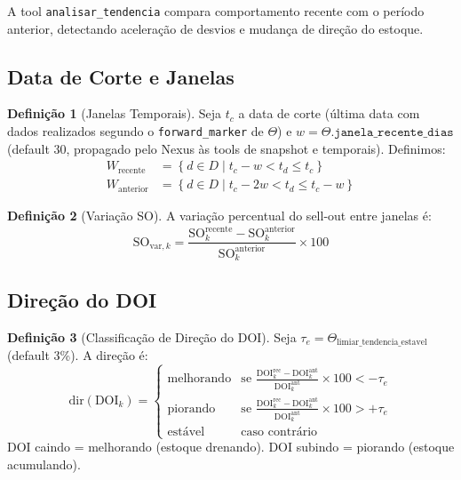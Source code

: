 \documentclass[a4paper, 12pt]{report}
\theoremstyle{definition}
\newtheorem{definicao}{Defini\c{c}\~ao}[chapter]
\theoremstyle{remark}
\newcommand{\set}[1]{\left\{#1\right\}}
\begin{document}
A tool \texttt{analisar\_tendencia} compara comportamento recente
com o per\'iodo anterior, detectando acelera\c{c}\~ao de desvios e
mudan\c{c}a de dire\c{c}\~ao do estoque.

\subsection{Data de Corte e Janelas}

\begin{definicao}[Janelas Temporais]
  Seja $t_c$ a data de corte (\'ultima data com dados realizados segundo
  o \texttt{forward\_marker} de $\Theta$) e
  $w = \Theta.\texttt{janela\_recente\_dias}$ (default $30$, propagado
  pelo Nexus \`as tools de snapshot e temporais). Definimos:
  \begin{align}
    W_{\text{recente}} &= \set{d \in D \mid t_c - w < t_d \leq t_c} \\
    W_{\text{anterior}} &= \set{d \in D \mid t_c - 2w < t_d \leq t_c - w}
  \end{align}
\end{definicao}

\begin{definicao}[Varia\c{c}\~ao SO]
  A varia\c{c}\~ao percentual do sell-out entre janelas \'e:
  \[
    \text{SO}_{\text{var},k} =
    \frac{\text{SO}^{\text{recente}}_k - \text{SO}^{\text{anterior}}_k}
         {\text{SO}^{\text{anterior}}_k} \times 100
  \]
\end{definicao}

\subsection{Dire\c{c}\~ao do DOI}

\begin{definicao}[Classifica\c{c}\~ao de Dire\c{c}\~ao do DOI]
  Seja $\tau_e = \Theta_{\text{limiar\_tendencia\_estavel}}$ (default 3\%).
  A dire\c{c}\~ao \'e:
  \[
    \text{dir}(\text{DOI}_k) = \begin{cases}
      \text{melhorando} & \text{se } \frac{\text{DOI}^{\text{rec}}_k - \text{DOI}^{\text{ant}}_k}
        {\text{DOI}^{\text{ant}}_k} \times 100 < -\tau_e \\[6pt]
      \text{piorando} & \text{se } \frac{\text{DOI}^{\text{rec}}_k - \text{DOI}^{\text{ant}}_k}
        {\text{DOI}^{\text{ant}}_k} \times 100 > +\tau_e \\[6pt]
      \text{est\'avel} & \text{caso contr\'ario}
    \end{cases}
  \]
  DOI caindo = melhorando (estoque drenando).
  DOI subindo = piorando (estoque acumulando).
\end{definicao}
\end{document}
